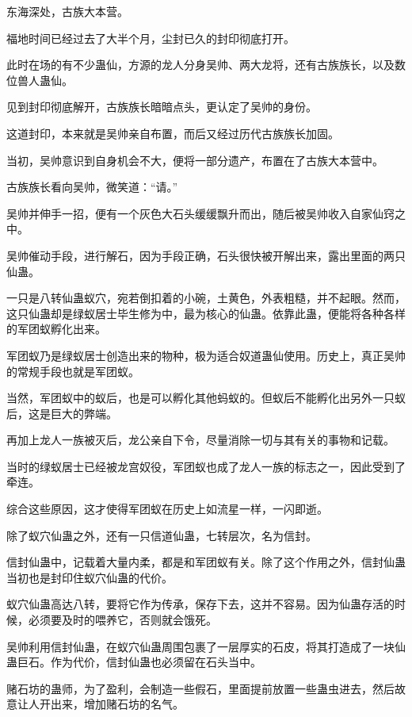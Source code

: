 
\begin{this_body}

东海深处，古族大本营。

福地时间已经过去了大半个月，尘封已久的封印彻底打开。

此时在场的有不少蛊仙，方源的龙人分身吴帅、两大龙将，还有古族族长，以及数位兽人蛊仙。

见到封印彻底解开，古族族长暗暗点头，更认定了吴帅的身份。

这道封印，本来就是吴帅亲自布置，而后又经过历代古族族长加固。

当初，吴帅意识到自身机会不大，便将一部分遗产，布置在了古族大本营中。

古族族长看向吴帅，微笑道：“请。”

吴帅并伸手一招，便有一个灰色大石头缓缓飘升而出，随后被吴帅收入自家仙窍之中。

吴帅催动手段，进行解石，因为手段正确，石头很快被开解出来，露出里面的两只仙蛊。

一只是八转仙蛊蚁穴，宛若倒扣着的小碗，土黄色，外表粗糙，并不起眼。然而，这只仙蛊却是绿蚁居士毕生修为中，最为核心的仙蛊。依靠此蛊，便能将各种各样的军团蚁孵化出来。

军团蚁乃是绿蚁居士创造出来的物种，极为适合奴道蛊仙使用。历史上，真正吴帅的常规手段也就是军团蚁。

当然，军团蚁中的蚁后，也是可以孵化其他蚂蚁的。但蚁后不能孵化出另外一只蚁后，这是巨大的弊端。

再加上龙人一族被灭后，龙公亲自下令，尽量消除一切与其有关的事物和记载。

当时的绿蚁居士已经被龙宫奴役，军团蚁也成了龙人一族的标志之一，因此受到了牵连。

综合这些原因，这才使得军团蚁在历史上如流星一样，一闪即逝。

除了蚁穴仙蛊之外，还有一只信道仙蛊，七转层次，名为信封。

信封仙蛊中，记载着大量内柔，都是和军团蚁有关。除了这个作用之外，信封仙蛊当初也是封印住蚁穴仙蛊的代价。

蚁穴仙蛊高达八转，要将它作为传承，保存下去，这并不容易。因为仙蛊存活的时候，必须要及时的喂养它，否则就会饿死。

吴帅利用信封仙蛊，在蚁穴仙蛊周围包裹了一层厚实的石皮，将其打造成了一块仙蛊巨石。作为代价，信封仙蛊也必须留在石头当中。

赌石坊的蛊师，为了盈利，会制造一些假石，里面提前放置一些蛊虫进去，然后故意让人开出来，增加赌石坊的名气。


\end{this_body}
